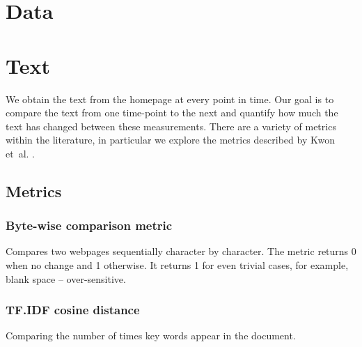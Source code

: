 \documentclass[10pt, a4paper]{article}
\begin{document}

\section{Data}

\section{Text}
We obtain the text from the homepage at every point in time. Our goal is to compare the text from one time-point to the next and quantify how much the text has changed between these measurements. There are a variety of metrics within the literature, in particular we explore the metrics described by Kwon et~al.  \cite{kwon2006precise}.
\subsection{Metrics}
\subsubsection*{Byte-wise comparison metric}
Compares two webpages sequentially character by character. The metric returns 0 when no change and 1 otherwise. It returns 1 for even trivial cases, for example, blank space -- over-sensitive.

\subsubsection*{TF.IDF cosine distance}
Comparing the number of times key words appear in the document.
\end{document}
